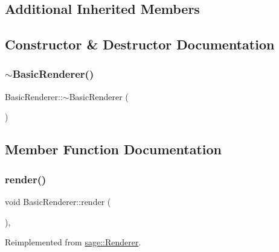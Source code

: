\subsection*{Additional Inherited Members}


\subsection{Constructor \& Destructor Documentation}
\mbox{\label{classsage_1_1BasicRenderer_a9808c8f288a5ab275076223370c4aa00}} 
\subsubsection{\texorpdfstring{$\sim$BasicRenderer()}{~BasicRenderer()}}
{\footnotesize\ttfamily Basic\+Renderer\+::$\sim$\+Basic\+Renderer (\begin{DoxyParamCaption}{ }\end{DoxyParamCaption})}



\subsection{Member Function Documentation}
\mbox{\label{classsage_1_1BasicRenderer_a127bbe33d8ef13fc64ff2e3943c0636b}} 
\subsubsection{\texorpdfstring{render()}{render()}\hspace{0.1cm}{\footnotesize\ttfamily [1/2]}}
{\footnotesize\ttfamily void Basic\+Renderer\+::render (\begin{DoxyParamCaption}{ }\end{DoxyParamCaption})\hspace{0.3cm}{\ttfamily [override]}, {\ttfamily [virtual]}}



Reimplemented from \mbox{\hyperlink{classsage_1_1Renderer_af7e5f8f68742f198e315fb4683a605a4}{sage\+::\+Renderer}}.

